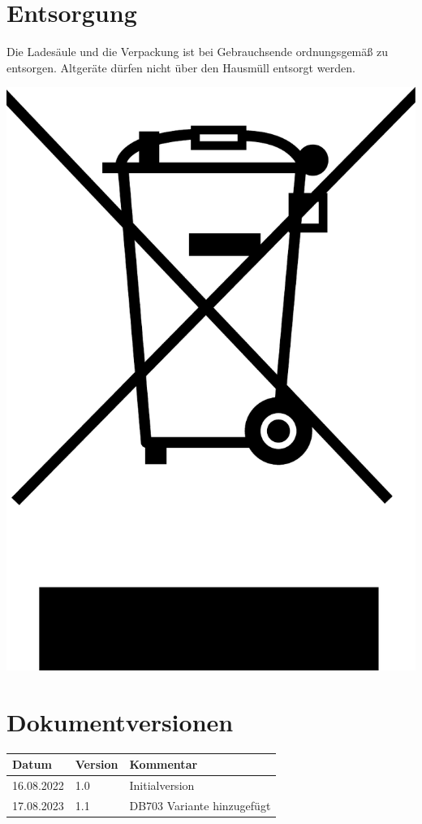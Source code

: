 \documentclass[a4paper,10pt]{article}
\begin{document}
\begin{multicols*}{2}
	\section{Entsorgung}
	\begin{minipage}{0.40\textwidth}
		Die Ladesäule und die Verpackung ist bei Gebrauchsende ordnungsgemäß zu
		entsorgen. Altgeräte dürfen nicht über den Hausmüll entsorgt werden.
	\end{minipage}\hfill
	\begin{minipage}{0.07\textwidth}
		\includegraphics[width=\linewidth]{./img/weee.pdf}
	\end{minipage}

	\section{Dokumentversionen}
	\begin{tabular}{lll}
		\toprule
		Datum      & Version & Kommentar                   \\
		\midrule
		16.08.2022 & 1.0     & Initialversion              \\
		17.08.2023 & 1.1     & DB703 Variante hinzugefügt    \\
		\bottomrule
	\end{tabular}

	\end{multicols*}
	\pagestyle{empty}
	\newpage
	\null
	\newpage
	\newpage
	\null
	\newpage
	\pagestyle{fancy}
\end{document}

